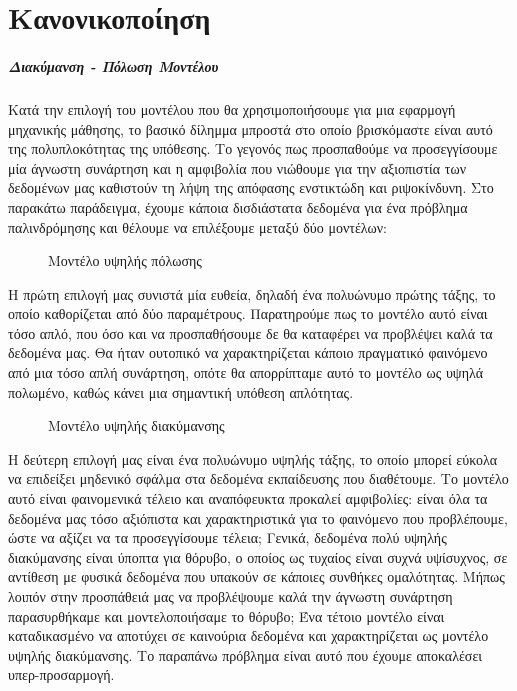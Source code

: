\chapter{Κανονικοποίηση}
\label{appendix:Reg}
\paragraph{Διακύμανση - Πόλωση Μοντέλου}
Κατά την επιλογή του μοντέλου που θα χρησιμοποιήσουμε για μια εφαρμογή μηχανικής μάθησης, το βασικό δίλημμα μπροστά στο οποίο βρισκόμαστε είναι αυτό της πολυπλοκότητας της υπόθεσης. Το γεγονός πως προσπαθούμε να προσεγγίσουμε μία άγνωστη συνάρτηση και η αμφιβολία που νιώθουμε για την αξιοπιστία των δεδομένων μας καθιστούν τη λήψη της απόφασης ενστικτώδη και ριψοκίνδυνη. Στο παρακάτω παράδειγμα, έχουμε κάποια δισδιάστατα δεδομένα για ένα πρόβλημα παλινδρόμησης και θέλουμε να επιλέξουμε μεταξύ δύο μοντέλων:
\begin{figure}[H]
	\centering			
	\caption[Μοντέλο υψηλής πόλωσης]{Μοντέλο υψηλής πόλωσης}
\end{figure}
Η πρώτη επιλογή μας συνιστά μία ευθεία, δηλαδή ένα πολυώνυμο πρώτης τάξης, το οποίο καθορίζεται από δύο παραμέτρους. Παρατηρούμε πως το μοντέλο αυτό είναι τόσο απλό, που όσο και να προσπαθήσουμε δε θα καταφέρει να προβλέψει καλά τα δεδομένα μας. Θα ήταν ουτοπικό να χαρακτηρίζεται κάποιο πραγματικό φαινόμενο από μια τόσο απλή συνάρτηση, οπότε θα απορρίπταμε αυτό το μοντέλο ως υψηλά πολωμένο, καθώς κάνει μια σημαντική υπόθεση απλότητας.
\begin{figure}[H]
	\centering			
	\caption[Μοντέλο υψηλής διακύμανσης]{Μοντέλο υψηλής διακύμανσης}
\end{figure}
Η δεύτερη επιλογή μας είναι ένα πολυώνυμο υψηλής τάξης, το οποίο μπορεί εύκολα να επιδείξει μηδενικό σφάλμα στα δεδομένα εκπαίδευσης που διαθέτουμε. Το μοντέλο αυτό είναι φαινομενικά τέλειο και αναπόφευκτα προκαλεί αμφιβολίες: είναι όλα τα δεδομένα μας τόσο αξιόπιστα και χαρακτηριστικά για το φαινόμενο που προβλέπουμε, ώστε να αξίζει να τα προσεγγίσουμε τέλεια; Γενικά, δεδομένα πολύ υψηλής διακύμανσης είναι ύποπτα για θόρυβο, ο οποίος ως τυχαίος είναι συχνά υψίσυχνος, σε αντίθεση με φυσικά δεδομένα που υπακούν σε κάποιες συνθήκες ομαλότητας. Μήπως λοιπόν στην προσπάθειά μας να προβλέψουμε καλά την άγνωστη συνάρτηση παρασυρθήκαμε και μοντελοποιήσαμε το θόρυβο; Ένα τέτοιο μοντέλο είναι καταδικασμένο να αποτύχει σε καινούρια δεδομένα και χαρακτηρίζεται ως μοντέλο υψηλής διακύμανσης. Το παραπάνω πρόβλημα είναι αυτό που έχουμε αποκαλέσει υπερ-προσαρμογή.

